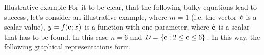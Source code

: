 \begin{subsection}{Illustrative example}
For it to be clear, that the following bulky equations lead to success, let's consider an illustrative example, where $m=1$ (i.e. the vector $\dot{\textbf{c}}$ is a scalar value), $y=f(\textbf{c};x)$ is a function with one parameter, where $\dot{\textbf{c}}$ is a scalar that has to be found. In this case $n=6$ and $D=\{ \textbf{c}: 2 \leq \textbf{c} \leq 6 \}$. In this way, the following graphical representations form.
\begin{figure}[h!]%
    \centering
    \qquad
    \caption{ }%
    \label{fig:example}%
\end{figure}


\end{subsection}
